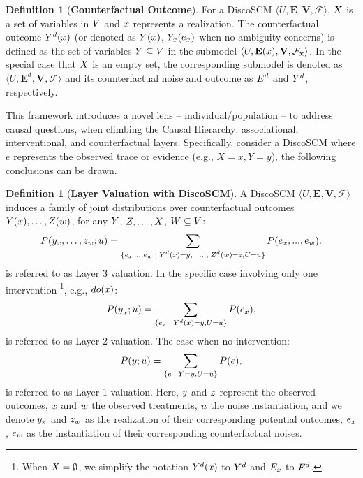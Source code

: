 \documentclass[letterpaper]{article} %
\theoremstyle{definition}
\newtheorem{definition}[theorem]{Definition}
\theoremstyle{remark}
\begin{document}
\begin{definition}[\textbf{Counterfactual Outcome}]
    For a DiscoSCM $\langle  U, \mathbf{E}, \mathbf{V}, \mathcal{F}\rangle$, $\*X$ is a set of variables in $\*V$ and $\*x$ represents a realization. The counterfactual outcome $\*Y^d(\*x)$ (or denoted as $\*Y(\*x)$, $\*Y_{\*x}(\*e_{\*x})$ when no ambiguity concerns) is defined as the set of variables $\*Y \subseteq \*V$ in the submodel $\langle U, \mathbf{E}(\*x), \mathbf{V}, \mathcal{F}_{\mathbf{x}}\rangle$. In the special case that $\*X$ is an empty set, the corresponding submodel is denoted as $\langle U, \mathbf{E}^d, \mathbf{V}, \mathcal{F}\rangle$ and its counterfactual noise and outcome as $\*E^d$ and $\*Y^d$, respectively.
\end{definition}




This framework introduces a novel lens -- individual/population -- to address causal questions, when climbing the Causal Hierarchy: associational, interventional, and counterfactual layers. Specifically, consider a DiscoSCM where \(e\) represents the observed trace or evidence (e.g., $X = x, Y = y$), the following conclusions can be drawn.

\begin{definition}[\textbf{Layer Valuation with DiscoSCM}]
\label{def:semantics}
A DiscoSCM $\langle U, \mathbf{E}, \mathbf{V}, \mathcal{F}\rangle$ induces a family of joint distributions over counterfactual outcomes $\*Y(\*x), \ldots, \*Z({\*w})$, for any $\*Y$, $\*Z, \dots, \*X$, $\*W \subseteq \*V$:
\begin{align}\label{eq:def:l3-semantics_new}
    P(\*{y}_{\*{x}},\dots,\*{z}_{\*{w}}; u) =
\sum_{\substack{\{\*e_{\*x}\, ...,  \*e_{\*w}\;\mid\;\*{Y}^d({\*x})=\*{y},\;\;\;\dots,\; \*{Z}^d({\*w})=\*z, U=u\}}}
    P(\*e_{\*x}, ..., \*e_{\*w}).
\end{align}
is referred to as Layer 3 valuation. In the specific case involving only one intervention \footnote{When \( \*X = \emptyset \), we simplify the notation \( \*Y^d(\*x) \) to \( \*Y^d \) and \( \*E_{\*x} \) to \( \*E^d \).
}, e.g., $do(\*x)$:
\begin{align}
    \label{eq:def:l2-semantics_new}
    P({\*y}_{\*x}; u) = 
    \sum_{\{\*e_{\*x} \;\mid\; {\*Y}^d({\*x})={\*y}, U=u\}}
    P(\*e_{\*x}),
\end{align}
is referred to as Layer 2 valuation. The case when no intervention:
\begin{align}
    \label{eq:def:l1-semantics_new}
    P({\*y}; u) = 
    \sum_{\{\*e \;\mid\; {\*Y}={\*y}, U=u\}}
    P(\*e),
\end{align}
is referred to as Layer 1 valuation. Here, $\*y$ and $\*z$ represent the observed outcomes, $\*x$ and $\*w$ the observed treatments, $\*u$ the noise instantiation, and we denote $\*y_{\*x}$ and $\*z_{\*w}$ as the realization of their corresponding potential outcomes, $\*e_{\*x}$, $\*e_{\*w}$ as the instantiation of their corresponding counterfactual noises.
\end{definition}
\end{document}
